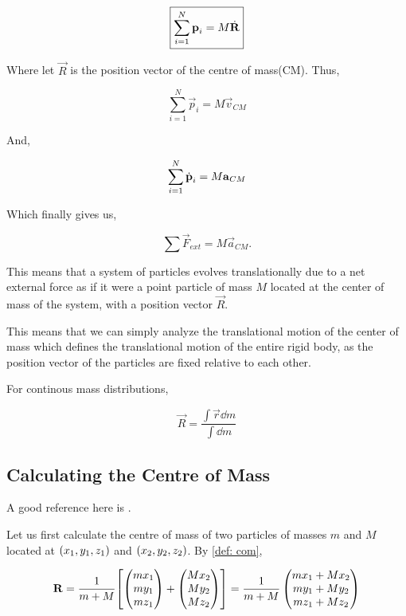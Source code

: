 \begin{equation}
    \boxed{\sum_{i=1}^N \boldsymbol{\mathbf{p}}_i = M\dot{\mathbf{R}}}
\end{equation}

Where let \(\vec{R}\) is the position vector of the centre of mass(CM). Thus, 

\begin{equation*}
    {\sum_{i=1}^N \vec{p}_i = M\vec{v}_{CM}}
\end{equation*}

And, 

\begin{equation*}
    {\sum_{i=1}^N \dot{\boldsymbol{\mathbf{p}}}_i = M\boldsymbol{\mathbf{a}}_{CM}}
\end{equation*}

Which finally gives us,

\begin{equation}
    \boxed{\sum \Vec{F}_{ext} = M\vec{a}_{CM}.}
\end{equation}

This means that a system of particles evolves translationally due to a net external force as if
it were a point particle of mass \(M\) located at the center of mass of the system, with 
a position vector \(\Vec{R}\).

This means that we can simply analyze the translational motion of the center of mass which 
defines the translational motion of the entire rigid body, as the 
position vector of the particles are fixed relative to each other.

For continous mass distributions, 

\begin{equation}
    \Vec{R} = \frac{\int\vec{r}\dd{m}}{\int\dd{m}}
\end{equation}

\subsection{Calculating the Centre of Mass}

A good reference here is \cite{wangricardo}.

Let us first calculate the centre of mass of two particles of masses 
\(m\) and \(M\) located at \(\qty(x_1, y_1, z_1)\) and \(\qty(x_2, y_2, z_2)\). 
By \cref{def: com}, 

\begin{equation*}
    \mathbf{R} = \frac{1}{m+M}\qty[\begin{pmatrix} mx_1 \\ my_1 \\ mz_1\end{pmatrix} + \begin{pmatrix} Mx_2 \\ My_2 \\ Mz_2\end{pmatrix}]
    = \frac{1}{m + M}\begin{pmatrix} mx_1 + Mx_2 \\ my_1 + My_2 \\ mz_1 + Mz_2\end{pmatrix}
\end{equation*}

